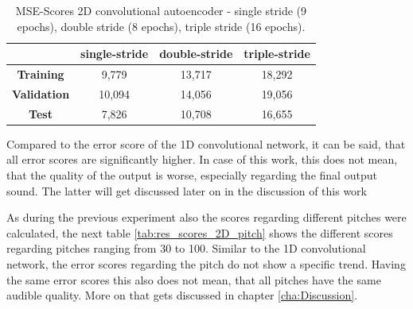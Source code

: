 \begin{table}[htb!]
    \centering
    \begin{tabular}{|c|c|c|c|}
        \hline
         & \textbf{single-stride} & \textbf{double-stride} & \textbf{triple-stride} \\
         \hline
        \textbf{Training} & 9,779 & 13,717 & 18,292 \\
        \hline
        \textbf{Validation} & 10,094 & 14,056 & 19,056 \\
        \hline
        \textbf{Test} & 7,826 & 10,708 & 16,655 \\
        \hline
    \end{tabular}
    \caption{MSE-Scores 2D convolutional autoencoder - single stride (9 epochs), double stride (8 epochs), triple stride (16 epochs).}
    \label{tab:res_scores_2Dcae}
\end{table}

Compared to the error score of the 1D convolutional network, it can be said, that all error scores are significantly higher. In case of this work, this does not mean, that the quality of the output is worse, especially regarding the final output sound. The latter will get discussed later on in the discussion of this work

As during the previous experiment also the scores regarding different pitches were calculated, the next table \ref{tab:res_scores_2D_pitch} shows the different scores regarding pitches ranging from 30 to 100. Similar to the 1D convolutional network, the error scores regarding the pitch do not show a specific trend. Having the same error scores this also does not mean, that all pitches have the same audible quality. More on that gets discussed in chapter \ref{cha:Discussion}. 


